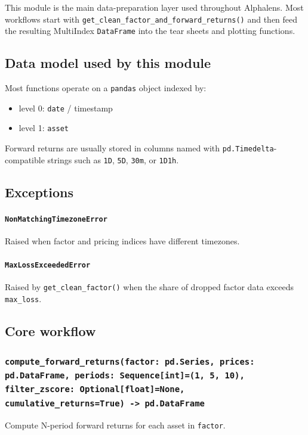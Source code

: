 \documentclass[11pt]{article}
\begin{document}
This module is the main data-preparation layer used throughout Alphalens. Most workflows start with \texttt{get\_clean\_factor\_and\_forward\_returns()} and then feed the resulting MultiIndex \texttt{DataFrame} into the tear sheets and plotting functions.

\subsection{Data model used by this module}

Most functions operate on a \texttt{pandas} object indexed by:

\begin{itemize}
  \item level 0: \texttt{date} / timestamp
  \item level 1: \texttt{asset}
\end{itemize}

Forward returns are usually stored in columns named with \texttt{pd.Timedelta}-compatible strings such as \texttt{1D}, \texttt{5D}, \texttt{30m}, or \texttt{1D1h}.

\subsection{Exceptions}

\paragraph{\texttt{NonMatchingTimezoneError}}
Raised when factor and pricing indices have different timezones.

\paragraph{\texttt{MaxLossExceededError}}
Raised by \texttt{get\_clean\_factor()} when the share of dropped factor data exceeds \texttt{max\_loss}.

\subsection{Core workflow}

\subsubsection{\texttt{compute\_forward\_returns(factor: pd.Series, prices: pd.DataFrame, periods: Sequence[int]=(1, 5, 10), filter\_zscore: Optional[float]=None, cumulative\_returns=True) -> pd.DataFrame}}
Compute N-period forward returns for each asset in \texttt{factor}.
\end{document}
